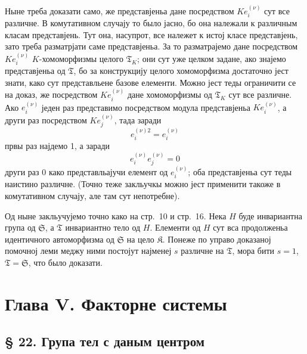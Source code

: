 \documentclass[11pt]{article}
\begin{document}
Ныне треба доказати само, же представјеньа дане посредством \(K e_i^{(\nu)}\) сут все различне. В комутативном случају то было јасно, бо она належали к различным класам представјень. Тут она, насупрот, все належет к истој класе представјень, зато треба разматрјати саме представјеньа. За то разматрајемо дане посредством \(K e_i^{(\nu)}\) \(K\)-хомоморфизмы целого \(\mathfrak T_K\); они сут уже целком задане, ако знајемо представјеньа од \(\mathfrak T\), бо за конструкцију целого хомоморфизма достаточно јест знати, како сут представльене базове елементи. Можно јест теды ограничити се на доказ, же посредством \(K e_i^{(\nu)}\) дане хомоморфизмы од \(\mathfrak T_K\) сут все различне. Ако \(e_i^{(\nu)}\) једен раз представимо посредством модула представјеньа \(K e_i^{(\nu)}\), а други раз посредством \(K e_j^{(\nu)}\), тада заради
\[
e_i^{(\nu)2}=e_i^{(\nu)}
\]
првы раз најдемо 1, а заради
\[
e_i^{(\nu)}e_j^{(\nu)}=0
\]
други раз 0 како представльајучи елемент од \(e_i^{(\nu)}\); оба представјеньа сут теды наистино различне. (Точно теже закльучкы можно јест применити такоже в комутативном случају, але там сут непотребне).

Од ныне закльучујемо точно како на стр.~10 и стр.~16. Нека \(H\) буде инвариантна група од \(\mathfrak S\), а \(\mathfrak T\) инвариантно тело од \(H\). Елементи од \(H\) сут вса продолженьа идентичного автоморфизма од \(\mathfrak S\) на цело \(\mathfrak K\). Понеже по управо доказаној помочној леми меджу ними постојут најменеј \(s\) различне на \(\mathfrak T\), мора бити \(s=1\), \(\mathfrak T=\mathfrak S\), что было доказати.

\section*{Глава V. Факторне системы}\label{kapitel-v.-faktorensysteme}

\subsection*{§ 22. Група тел с даным центром}\label{die-gruppe-der-koerper-mit-gegebenem-zentrum}
\end{document}
